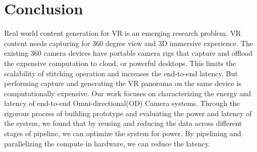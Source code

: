 \chapter{Conclusion}
Real world content generation for VR is an emerging research problem. VR content needs capturing for 360 degree view and 3D immersive experience. The existing 360 camera devices have portable camera rigs that capture and offload the expensive computation to cloud, or powerful desktops. This limits the scalability of stitching operation  and increases the end-to-end latency. But performing capture and generating the VR panorama on the same device is computationally expensive. 	Our work focuses on characterizing the energy and latency of end-to-end Omni-directional(OD) Camera  systems. Through the rigorous process of building prototype and evaluating the power and latency of the system, we found that by reusing and reducing the data across different stages of pipeline, we can optimize the system for power. By pipelining and parallelizing the compute in hardware, we can reduce the latency.


